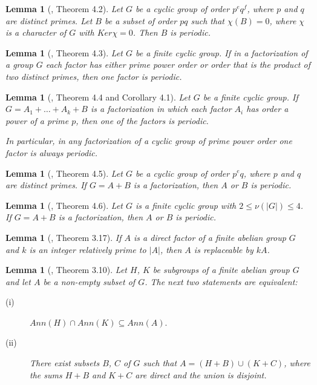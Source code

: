\documentclass[preprint]{elsarticle}
\newtheorem{lem}[thm]{Lemma}
\begin{document}
\begin{lem}[\cite{[SS]}, Theorem 4.2] \label{pq-periodic}
Let $G$ be a cyclic group of order $p^eq^f$, where $p$ and $q$ are distinct primes.
Let $B$ be a subset of order $pq$ such that $\chi(B) = 0$, where $\chi$ is a character of $G$ with $Ker\chi ={0}$.
Then $B$ is periodic.
\end{lem}

\begin{lem}[\cite{[SS]}, Theorem 4.3] \label{periodic}
Let $G$ be a finite cyclic group.
If in a factorization of a group $G$ each factor has either prime power order or order that is the product of two distinct primes, then one factor is periodic.
\end{lem}

\begin{lem}[\cite{[SS]}, Theorem 4.4 and Corollary 4.1] \label{periodic2}
Let $G$ be a finite cyclic group.
If $G = A_1 +\ldots+A_k +B$ is a factorization in which each factor $A_i$ has order a power of a prime $p$,
then one of the factors is periodic.

In particular, in any factorization of a cyclic group of prime power order one factor is always periodic.
\end{lem}

\begin{lem}[\cite{[SS]}, Theorem 4.5] \label{periodic3}
Let $G$ be a cyclic group of order $p^eq$, where $p$ and $q$ are distinct primes.
If $G = A+B$ is a factorization,
then $A$ or $B$ is periodic.
\end{lem}

\begin{lem}[\cite{[SS]}, Theorem 4.6] \label{periodic4}
Let $G$ is a finite cyclic group with $2\leq \nu(|G|)\leq 4$.
If $G = A+B$ is a factorization,
then $A$ or $B$ is periodic.
\end{lem}

\begin{lem}[\cite{[SS]}, Theorem 3.17] \label{k-replace}
If $A$ is a direct factor of a finite abelian group $G$ and $k$ is an integer relatively prime to $|A|$,
then $A$ is replaceable by $kA$.
\end{lem}

\begin{lem}[\cite{[SS]}, Theorem 3.10] \label{fac-equ}
Let $H$, $K$ be subgroups of a finite abelian group $G$ and let $A$ be a non-empty subset of $G$.
The next two statements are equivalent:
\begin{description}
  \item[(i)] $Ann(H)\cap Ann(K)\subseteq Ann(A).$
  \item[(ii)] There exist subsets $B$, $C$ of $G$ such that $A = (H +B)\cup(K +C)$, where the sums $H + B$ and $K + C$ are direct and the union is disjoint.
\end{description}
\end{lem}
\end{document}
